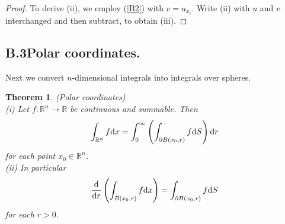 \documentclass[hyperref,UTF8,12pt]{article}
\numberwithin{equation}{subsection}
\theoremstyle{plain}
\newtheorem{theorem}{Theorem}
\theoremstyle{definition}
\numberwithin{theorem}{section}
\numberwithin{lemma}{section}
\numberwithin{proposition}{section}
\numberwithin{remark}{section}
\numberwithin{corollary}{section}
\numberwithin{definition}{section}
\numberwithin{problem}{section}
\numberwithin{example}{section}
\def\dif{\textup{d}}
\newcommand{\ptl}{\partial}
\newcommand{\mr}{\mathbb{R}}
\begin{document}
\begin{appendices}
\begin{proof}
To derive (ii), we employ (\ref{B2}) with $v=u_{x_i}$. Write (ii) with $u$ and $v$ interchanged and then subtract, to obtain (iii).
\end{proof}

\subsection*{B.3\quad Polar coordinates.}\label{polar}
Next we convert $n$-dimensional integrals into integrals over spheres.
\begin{theorem}\label{b4}
(Polar coordinates)\\\textup{(i)} Let $f:\mr^n\to\mr$ be continuous and summable. Then
\[\int_{\mr^n}f\dif x=\int_0^\infty\left(\int_{\ptl B(x_0,r)} f\dif S\right)\dif r\]
for each point $x_0\in\mr^n$.\\
\textup{(ii)} In particular\[\frac{\dif}{\dif r}\left(\int_{B(x_0,r)}f\dif x\right)=\int_{\ptl B(x_0,r)}f\dif S\]for each $r>0$.
\end{theorem}


\end{appendices}
\end{document}
